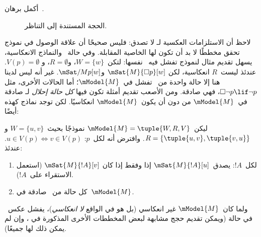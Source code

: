 \documentclass[../../../include/open-logic-section]{subfiles}
\begin{document}
\begin{prob}
  أكمل برهان~.
\end{prob}

\begin{figure}
  \begin{center}
  \end{center}
\caption{الحجة المستندة إلى التناظر.}
\end{figure}

لاحظ أن الاستلزامات العكسية لـ لا تصدق: فليس
صحيحًا أن علاقة الوصول في نموذج تحقق مخططًا لا بد أن تكون لها الخاصية
المقابلة. وفي حالة~ والنماذج الانعكاسية، يسهل تقديم مثال لنموذج
تفشل فيه~ نفسها: لتكن~$W = \{w\}$، و$R = \emptyset$، و
$V(p) = \emptyset$. عندئذ ليست~$R$ انعكاسية، لكن
$\mSat{M}{\Box p}[w]$ و$\mSat/{M}{p}[w]$. غير أنه ليس لدينا هنا إلا
حالة واحدة من~ تفشل في~$\mModel{M}$؛ أما الحالات الأخرى، مثل
$\Box \lnot p \lif \lnot p$، فهي صادقة. ومن الأصعب تقديم أمثلة تكون
فيها \emph{كل حالة إحلال} لـ صادقة في~$\mModel{M}$ من دون أن
يكون~$\mModel{M}$ انعكاسيًا. لكن توجد نماذج كهذه أيضًا:

\begin{prop}
  ليكن~$\mModel{M} = \tuple{W, R, V}$ نموذجًا بحيث~$W = \{u, v\}$
  و$R = \{\tuple{u,v}, \tuple{v,u}\}$. وافترض أنه لكل~$p$:
  $u \in V(p) \Leftrightarrow v \in V(p)$. عندئذ:
  \begin{enumerate}
  \item لكل~$!A$: يصدق~$\mSat{M}{!A}[u]$ إذا وفقط إذا كان
    $\mSat{M}{!A}[v]$ (استعمل الاستقراء على~$!A$).
  \item كل حالة من~ صادقة في~$\mModel{M}$.
  \end{enumerate}
  ولما كان~$\mModel{M}$ غير انعكاسي (بل هو في الواقع
  \emph{لا انعكاسي})، يفشل عكس~ في حالة
   (ويمكن تقديم حجج مشابهة لبعض المخططات الأخرى المذكورة في
  ، وإن لم يمكن ذلك لها جميعًا).
\end{prop}
\end{document}
